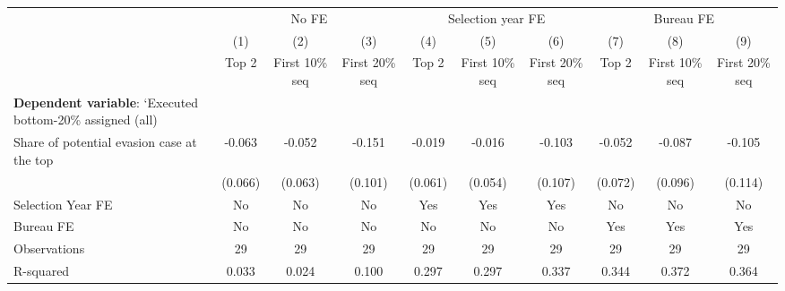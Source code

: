 {
\def\sym#1{\ifmmode^{#1}\else\(^{#1}\)\fi}
\begin{tabular}{l*{9}{c}}
\toprule
            &\multicolumn{3}{c}{No FE}                                        &\multicolumn{3}{c}{Selection year FE}                            &\multicolumn{3}{c}{Bureau FE}                                    \\\cmidrule(lr){2-4}\cmidrule(lr){5-7}\cmidrule(lr){8-10}
            &\multicolumn{1}{c}{(1)}&\multicolumn{1}{c}{(2)}&\multicolumn{1}{c}{(3)}&\multicolumn{1}{c}{(4)}&\multicolumn{1}{c}{(5)}&\multicolumn{1}{c}{(6)}&\multicolumn{1}{c}{(7)}&\multicolumn{1}{c}{(8)}&\multicolumn{1}{c}{(9)}\\
            &\multicolumn{1}{c}{Top 2}&\multicolumn{1}{c}{First 10\% seq}&\multicolumn{1}{c}{First 20\% seq}&\multicolumn{1}{c}{Top 2}&\multicolumn{1}{c}{First 10\% seq}&\multicolumn{1}{c}{First 20\% seq}&\multicolumn{1}{c}{Top 2}&\multicolumn{1}{c}{First 10\% seq}&\multicolumn{1}{c}{First 20\% seq}\\
\midrule
\textbf{Dependent variable}: `Executed bottom-20\% \/ assigned (all)&                     &                     &                     &                     &                     &                     &                     &                     &                     \\
\addlinespace
Share of potential evasion case at the top&      -0.063         &      -0.052         &      -0.151         &      -0.019         &      -0.016         &      -0.103         &      -0.052         &      -0.087         &      -0.105         \\
            &     (0.066)         &     (0.063)         &     (0.101)         &     (0.061)         &     (0.054)         &     (0.107)         &     (0.072)         &     (0.096)         &     (0.114)         \\
\midrule
Selection Year FE&          No         &          No         &          No         &         Yes         &         Yes         &         Yes         &          No         &          No         &          No         \\
Bureau FE   &          No         &          No         &          No         &          No         &          No         &          No         &         Yes         &         Yes         &         Yes         \\
Observations&          29         &          29         &          29         &          29         &          29         &          29         &          29         &          29         &          29         \\
R-squared   &       0.033         &       0.024         &       0.100         &       0.297         &       0.297         &       0.337         &       0.344         &       0.372         &       0.364         \\
\bottomrule
\end{tabular}
}
